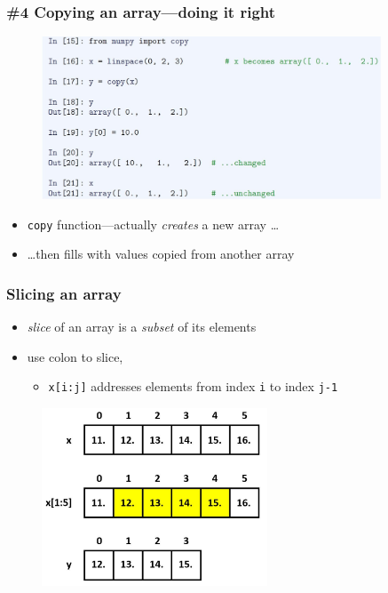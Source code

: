 \documentclass[english,14pt]{beamer}
\newcommand\red[1]{{\color{red} #1}}
\begin{document}
\begin{frame}[fragile]

\frametitle{\#4 Copying an array---doing it right}

\begin{figure}[ht]
	\centering
	\includegraphics[width=0.9\textwidth]{figures/LLp51a}
\end{figure}

\vspace*{-5mm}

\begin{itemize}
	\item \texttt{copy} function---actually \emph{creates} a new array \ldots
	\item[] \ldots then fills with values copied from another array
\end{itemize}

\end{frame}


\begin{frame}[fragile]

\frametitle{Slicing an array}

\begin{itemize}
	\item \red{\emph{slice}} of an array is a \emph{subset} of its elements
	\item use colon to slice, 
	\begin{itemize}
		\item \texttt{x[i:j]} addresses elements from index \texttt{i} to index \texttt{j-1}
	\end{itemize}
\end{itemize}
\vspace*{-3mm}
\begin{figure}[ht]
	\centering
	\includegraphics[width=0.6\textwidth]{figures/LLp51output}
\end{figure}

\end{frame}
\end{document}
